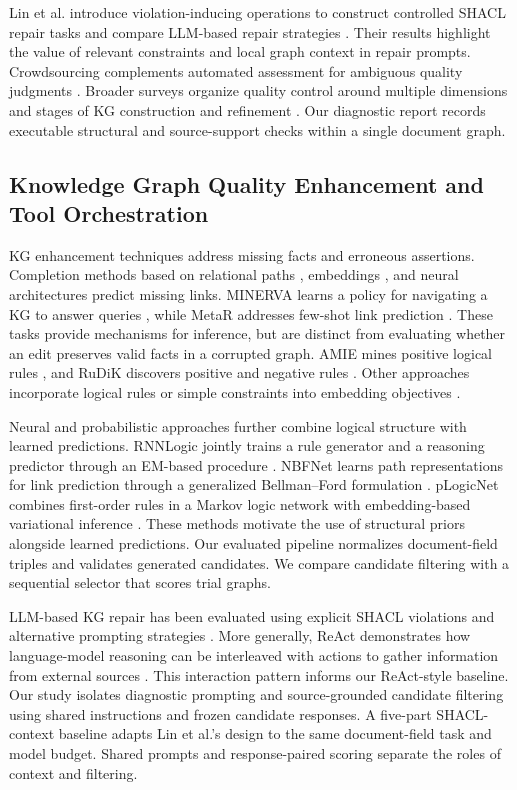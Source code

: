 Lin et al. introduce violation-inducing operations to construct controlled SHACL repair tasks and compare LLM-based repair strategies \citep{ref_lin2025}. Their results highlight the value of relevant constraints and local graph context in repair prompts. Crowdsourcing complements automated assessment for ambiguous quality judgments \citep{ref_acosta2013}. Broader surveys organize quality control around multiple dimensions and stages of KG construction and refinement \citep{ref_wang2021,ref_paulheim2017}. Our diagnostic report records executable structural and source-support checks within a single document graph.

\subsection{Knowledge Graph Quality Enhancement and Tool Orchestration}

KG enhancement techniques address missing facts and erroneous assertions. Completion methods based on relational paths \citep{ref_lao2011}, embeddings \citep{ref_bordes2013,ref_yang2015,ref_shi2017}, and neural architectures \citep{ref_dettmers2018} predict missing links. MINERVA learns a policy for navigating a KG to answer queries \citep{ref_das2018}, while MetaR addresses few-shot link prediction \citep{ref_chen2019}. These tasks provide mechanisms for inference, but are distinct from evaluating whether an edit preserves valid facts in a corrupted graph. AMIE mines positive logical rules \citep{ref_galarraga2013}, and RuDiK discovers positive and negative rules \citep{ref_ortona2018}. Other approaches incorporate logical rules or simple constraints into embedding objectives \citep{ref_guo2016,ref_ding2018}.

Neural and probabilistic approaches further combine logical structure with learned predictions. RNNLogic jointly trains a rule generator and a reasoning predictor through an EM-based procedure \citep{ref_qu2021}. NBFNet learns path representations for link prediction through a generalized Bellman--Ford formulation \citep{ref_zhu2021}. pLogicNet combines first-order rules in a Markov logic network with embedding-based variational inference \citep{ref_qu2019}. These methods motivate the use of structural priors alongside learned predictions. Our evaluated pipeline normalizes document-field triples and validates generated candidates. We compare candidate filtering with a sequential selector that scores trial graphs.

LLM-based KG repair has been evaluated using explicit SHACL violations and alternative prompting strategies \citep{ref_lin2025}. More generally, ReAct demonstrates how language-model reasoning can be interleaved with actions to gather information from external sources \citep{ref_yao2023react}. This interaction pattern informs our ReAct-style baseline. Our study isolates diagnostic prompting and source-grounded candidate filtering using shared instructions and frozen candidate responses. A five-part SHACL-context baseline adapts Lin et al.'s design to the same document-field task and model budget. Shared prompts and response-paired scoring separate the roles of context and filtering.
